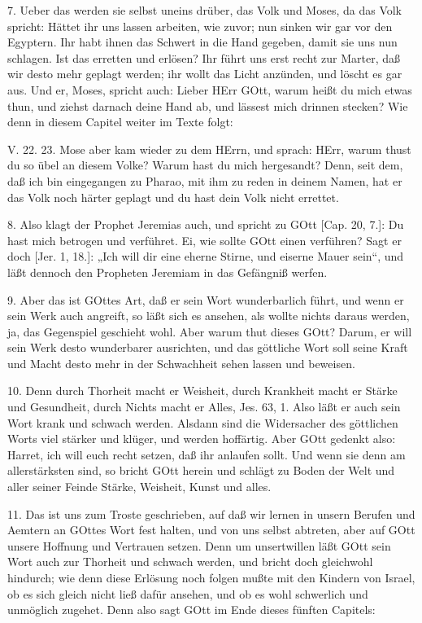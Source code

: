 7. Ueber das werden sie selbst uneins drüber, das Volk und Moses, da das Volk spricht: Hättet ihr uns lassen arbeiten, wie zuvor; nun sinken wir gar vor den Egyptern. Ihr habt ihnen das Schwert in die Hand gegeben, damit sie uns nun schlagen. Ist das erretten und erlösen? Ihr führt uns erst recht zur Marter, daß wir desto mehr geplagt werden; ihr wollt das Licht anzünden, und löscht es gar aus. Und er, Moses, spricht auch: Lieber HErr GOtt, warum heißt du mich etwas thun, und ziehst darnach deine Hand ab, und lässest mich drinnen stecken? Wie denn in diesem Capitel weiter im Texte folgt:

\begin{schriftzitat}
V. 22. 23. Mose aber kam wieder zu dem HErrn, und sprach: HErr, warum thust du so übel an diesem Volke? Warum hast du mich hergesandt? Denn, seit dem, daß ich bin eingegangen zu Pharao, mit ihm zu reden in deinem Namen, hat er das Volk noch härter geplagt und du hast dein Volk nicht errettet.
\end{schriftzitat}

8. Also klagt der Prophet Jeremias auch, und spricht zu GOtt [Cap. 20, 7.]: Du hast mich betrogen und verführet. Ei, wie sollte GOtt einen verführen? Sagt er doch [Jer. 1, 18.]: „Ich will dir eine eherne Stirne, und eiserne Mauer sein“, und läßt dennoch den Propheten Jeremiam in das Gefängniß werfen.

9. Aber das ist GOttes Art, daß er sein Wort wunderbarlich führt, und wenn er sein Werk auch angreift, so läßt sich es ansehen, als wollte nichts daraus werden, ja, das Gegenspiel geschieht wohl. Aber warum thut dieses GOtt? Darum, er will sein Werk desto wunderbarer ausrichten, und das göttliche Wort soll seine Kraft und Macht desto mehr in der Schwachheit sehen lassen und beweisen.

10. Denn durch Thorheit macht er Weisheit, durch Krankheit macht er Stärke und Gesundheit, durch Nichts macht er Alles, Jes. 63, 1. Also läßt er auch sein Wort krank und schwach werden. Alsdann sind die Widersacher des göttlichen Worts viel stärker und klüger, und werden hoffärtig. Aber GOtt gedenkt also: Harret, ich will euch recht setzen, daß ihr anlaufen sollt. Und wenn sie denn am allerstärksten sind, so bricht GOtt herein und schlägt zu Boden der Welt und aller seiner Feinde Stärke, Weisheit, Kunst und alles.

11. Das ist uns zum Troste geschrieben, auf daß wir lernen in unsern Berufen und Aemtern an GOttes Wort fest halten, und von uns selbst abtreten, aber auf GOtt unsere Hoffnung und Vertrauen setzen. Denn um unsertwillen läßt GOtt sein Wort auch zur Thorheit und schwach werden, und bricht doch gleichwohl hindurch; wie denn diese Erlösung noch folgen mußte mit den Kindern von Israel, ob es sich gleich nicht ließ dafür ansehen, und ob es wohl schwerlich und unmöglich zugehet. Denn also sagt GOtt im Ende dieses fünften Capitels:

